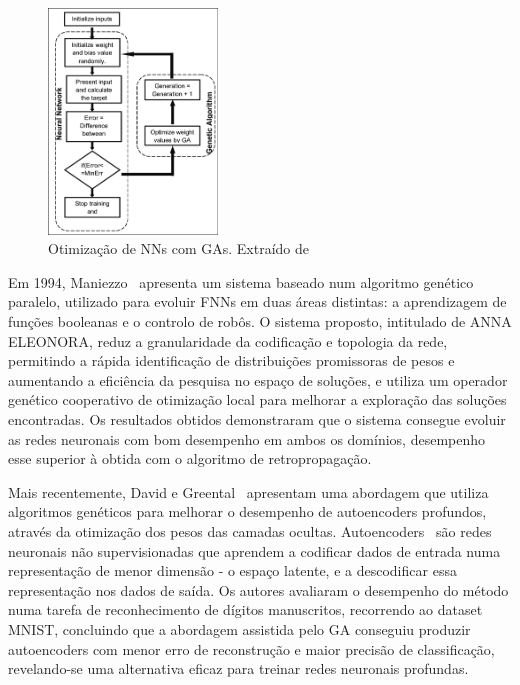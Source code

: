 \begin{figure}[htbp]
    \centering
    \includegraphics[width=0.4\textwidth]{imagens/ga_nn}
    \caption{Otimização de NNs com GAs. Extraído de~\cite{Rahman2015AnAlgorithms}}
    \label{fig:ga_nn}
\end{figure}

Em 1994, Maniezzo~\cite{Maniezzo1994} apresenta um sistema baseado num algoritmo genético paralelo, utilizado para evoluir FNNs em duas áreas distintas: a aprendizagem de funções booleanas e o controlo de robôs.
O sistema proposto, intitulado de ANNA ELEONORA, reduz a granularidade da codificação e topologia da rede, permitindo a rápida identificação de distribuições promissoras de pesos e aumentando a eficiência da pesquisa no espaço de soluções, e utiliza um operador genético cooperativo de otimização local para melhorar a exploração das soluções encontradas.
Os resultados obtidos demonstraram que o sistema consegue evoluir as redes neuronais com bom desempenho em ambos os domínios, desempenho esse superior à obtida com o algoritmo de retropropagação.

Mais recentemente, David e Greental~\cite{David2014GeneticNetworks} apresentam uma abordagem que utiliza algoritmos genéticos para melhorar o desempenho de autoencoders profundos, através da otimização dos pesos das camadas ocultas.
Autoencoders~\cite{Pierre2011} são redes neuronais não supervisionadas que aprendem a codificar dados de entrada numa representação de menor dimensão - o espaço latente, e a descodificar essa representação nos dados de saída.
Os autores avaliaram o desempenho do método numa tarefa de reconhecimento de dígitos manuscritos, recorrendo ao dataset MNIST, concluindo que a abordagem assistida pelo GA conseguiu produzir autoencoders com menor erro de reconstrução e maior precisão de classificação, revelando-se uma alternativa eficaz para treinar redes neuronais profundas.